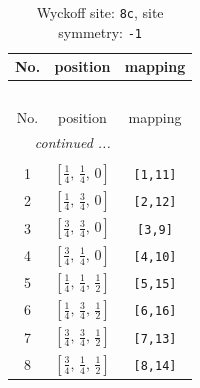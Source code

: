 \documentclass[fleqn,8pt]{jsarticle}
\begin{document}
\renewcommand{\arraystretch}{1.2}
\begin{longtable}{ccc}
\caption{Wyckoff site: {\tt 8c}, site symmetry: {\tt -1}}
 \\
 \hline \hline
No. & position & mapping \\ \hline \endfirsthead

\multicolumn{2}{l}{\tablename\ \thetable{}} \\
 \hline \hline
No. & position & mapping \\ \hline \endhead

 \hline \hline
\multicolumn{2}{r}{\footnotesize\it continued ...} \\ \endfoot

 \hline \hline
\multicolumn{2}{r}{} \\ \endlastfoot

1 & $\left[ \frac{1}{4},\, \frac{1}{4},\, 0 \right]$ & {\tt [1,11]} \\ \hline
2 & $\left[ \frac{1}{4},\, \frac{3}{4},\, 0 \right]$ & {\tt [2,12]} \\ \hline
3 & $\left[ \frac{3}{4},\, \frac{3}{4},\, 0 \right]$ & {\tt [3,9]} \\ \hline
4 & $\left[ \frac{3}{4},\, \frac{1}{4},\, 0 \right]$ & {\tt [4,10]} \\ \hline
5 & $\left[ \frac{1}{4},\, \frac{1}{4},\, \frac{1}{2} \right]$ & {\tt [5,15]} \\ \hline
6 & $\left[ \frac{1}{4},\, \frac{3}{4},\, \frac{1}{2} \right]$ & {\tt [6,16]} \\ \hline
7 & $\left[ \frac{3}{4},\, \frac{3}{4},\, \frac{1}{2} \right]$ & {\tt [7,13]} \\ \hline
8 & $\left[ \frac{3}{4},\, \frac{1}{4},\, \frac{1}{2} \right]$ & {\tt [8,14]} \\
\end{longtable}
\renewcommand{\arraystretch}{1.2}
\end{document}
